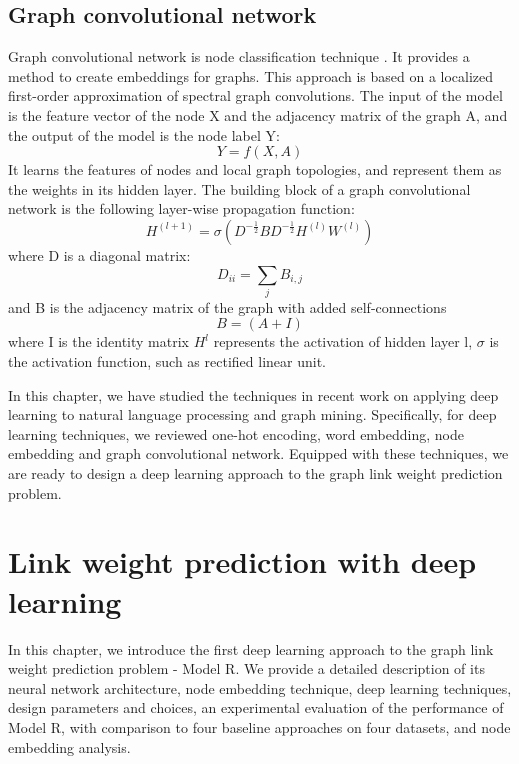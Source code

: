 \documentclass[12pt]{WSUThesis}
\theoremstyle{definition}
\begin{document}
\section{Graph convolutional network}
Graph convolutional network is node classification technique \cite{kipf2016semi}.
It provides a method to create embeddings for graphs.
This approach is based on a localized first-order approximation of spectral graph convolutions.
The input of the model is the feature vector of the node X and the adjacency matrix of the graph A, and the output of the model is the node label Y:
\[Y = f(X, A)\]
It learns the features of nodes and local graph topologies, and represent them as the weights in its hidden layer.
The building block of a graph convolutional network is the following layer-wise propagation function:
\[H^{(l+1)} = \sigma(D^{-\frac{1}{2}} B D^{-\frac{1}{2}} H^{(l)} W^{(l)})\]
where D is a diagonal matrix:
\[D_{ii} = \sum_jB_{i,j}\]
and B is the adjacency matrix of the graph with added self-connections
\[B = (A + I)\]
where I is the identity matrix
$ H^l $ represents the activation of hidden layer l,
$ \sigma $ is the activation function, such as rectified linear unit.

In this chapter, we have studied the techniques in recent work on applying deep learning to natural language processing and graph mining.
Specifically, for deep learning techniques, we reviewed one-hot encoding, word embedding, node embedding and graph convolutional network.
Equipped with these techniques, we are ready to design a deep learning approach to the graph link weight prediction problem.

\chapter{Link weight prediction with deep learning}
In this chapter, we introduce the first deep learning approach to the graph link weight prediction problem - Model R.
We provide a detailed description of its neural network architecture, node embedding technique, deep learning techniques, design parameters and choices, an experimental evaluation of the performance of Model R, with comparison to four baseline approaches on four datasets, and node embedding analysis.
\end{document}
